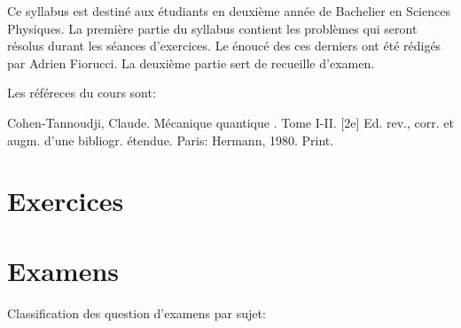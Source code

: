 \documentclass[a4paper,10pt]{book}
\begin{document}


\nocite{*}

\thispagestyle{plain}

Ce syllabus est destiné aux étudiants en deuxième année de Bachelier en Sciences Physiques. La première partie du syllabus contient les problèmes qui seront résolus durant les séances d'exercices. Le énoucé des ces derniers ont été rédigés par Adrien Fiorucci. La deuxième partie sert de recueille d'examen.

Les référeces du cours sont: 


Cohen-Tannoudji, Claude. Mécanique quantique . Tome I-II. [2e] Ed. rev., corr. et augm. d’une bibliogr. étendue. Paris: Hermann, 1980. Print.


\pagebreak

\thispagestyle{plain}

\tableofcontents

\pagebreak

\makeatletter
\renewcommand{\@chapapp}{Séance}
\makeatother

\part{Exercices}















\makeatletter
\renewcommand{\@chapapp}{Examen}
\makeatother

\part{Examens}

\thispagestyle{plain}

Classification des question d'examens par sujet:
\end{document}
